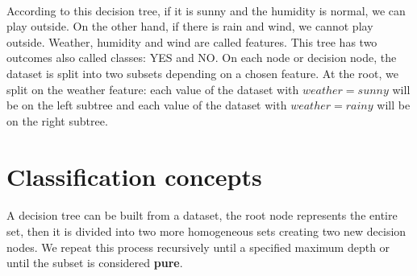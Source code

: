 \documentclass[12pt]{report}
\theoremstyle{definition}
\theoremstyle{definition}
\theoremstyle{definition}
\begin{document}
\paragraph{} According to this decision tree, if it is sunny and the humidity is normal, we can play outside.
On the other hand, if there is rain and wind, we cannot play outside. Weather, humidity and wind are called
features. This tree has two outcomes also called classes: YES and NO. On each node or decision node, the dataset
is split into two subsets depending on a chosen feature. At the root, we split on the weather feature: each
value of the dataset with $weather = sunny$ will be on the left subtree and each value of the dataset with
$weather = rainy$ will be on the right subtree.

\section{Classification concepts} %
\paragraph{} A decision tree can be built from a dataset, the root node represents the entire set, then it is
divided into two more homogeneous sets creating two new decision nodes. We repeat this process recursively
until a specified maximum depth or until the subset is considered \textbf{pure}.
\end{document}
